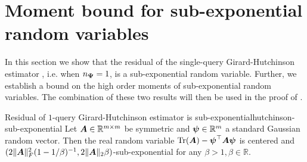 
\section{Moment bound for sub-exponential random variables}

In this section we show that the residual of the single-query Girard-Hutchinson estimator , i.e. when $n_{\boldsymbol{\Psi}} = 1$, is a sub-exponential random variable. Further, we establish a bound on the high order moments of sub-exponential random variables. The combination of these two results will then be used in the proof of .

\begin{lemma}{Residual of $1$-query Girard-Hutchinson estimator is sub-exponential}{hutchinson-sub-exponential}
    Let $\boldsymbol{A} \in \mathbb{R}^{m \times m}$ be symmetric and $\boldsymbol{\psi} \in \mathbb{R}^m$ a standard Gaussian random vector. Then the real random variable $\operatorname{Tr}(\boldsymbol{A}) - \boldsymbol{\psi}^{\top} \boldsymbol{A} \boldsymbol{\psi}$ is centered and $(2 \lVert \boldsymbol{A} \rVert _F^2 (1 - 1/\beta)^{-1}, 2 \lVert \boldsymbol{A} \rVert _2 \beta )$-sub-exponential for any $\beta > 1, \beta \in \mathbb{R}$.
\end{lemma}

